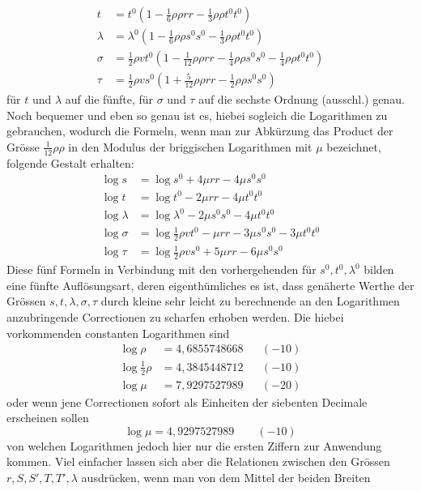 %
\[
\begin{aligned}
t&=t^0(1-\tfrac{1}{6}\rho\rho rr-\tfrac{1}{3}\rho\rho t^0t^0)\\
\lambda&=\lambda^0(1-\tfrac{1}{6}\rho\rho s^0s^0-\tfrac{1}{3}\rho\rho t^0t^0)\\
\sigma&=\tfrac{1}{2}\rho vt^0(1-\tfrac{1}{12}\rho\rho rr-\tfrac{1}{4}\rho\rho s^0s^0-\tfrac{1}{4}\rho\rho t^0t^0)\\
\tau&=\tfrac{1}{2}\rho vs^0(1+\tfrac{5}{12}\rho\rho rr-\tfrac{1}{2}\rho\rho s^0s^0)
\end{aligned}
\]
für \(t\) und \(\lambda\) auf die fünfte, für \(\sigma\) und \(\tau\) auf die sechste Ordnung (ausschl.) genau. Noch bequemer und eben so genau ist es, hiebei sogleich die Logarithmen zu gebrauchen, wodurch die Formeln, wenn man zur Abkürzung das Product der Grösse \(\tfrac{1}{12}\rho\rho\) in den Modulus der briggischen Logarithmen mit \(\mu\) bezeichnet, folgende Gestalt erhalten:
\[
\begin{aligned}
\log s&=\log s^0+4\mu rr-4\mu s^0s^0\\
\log t&=\log t^0-2\mu rr-4\mu t^0t^0\\
\log\lambda&=\log\lambda^0-2\mu s^0s^0-4\mu t^0t^0\\
\log\sigma&=\log\tfrac{1}{2}\rho vt^0-\mu rr-3\mu s^0s^0-3\mu t^0t^0\\
\log\tau&=\log\tfrac{1}{2}\rho vs^0+5\mu rr-6\mu s^0s^0
\end{aligned}
\]
\indent Diese fünf Formeln in Verbindung mit den vorhergehenden für \(s^0,t^0,\lambda^0\) bilden eine fünfte Auflösungsart, deren eigenthümliches es ist, dass genäherte Werthe der Grössen \(s,t,\lambda,\sigma,\tau\) durch kleine sehr leicht zu berechnende an den Logarithmen anzubringende Correctionen zu scharfen erhoben werden. Die hiebei vorkommenden constanten Logarithmen sind
\[
\begin{aligned}
\log\rho&=4{,}6855748668&&(-10)\\
\log\tfrac{1}{2}\rho&=4{,}3845448712&&(-10)\\
\log\mu&=7{,}9297527989&&(-20)
\end{aligned}
\]
oder wenn jene Correctionen sofort als Einheiten der siebenten Decimale erscheinen sollen
\[
\log\mu=4{,}9297527989\qquad(-10)
\]
von welchen Logarithmen jedoch hier nur die ersten Ziffern zur Anwendung kommen.
Viel einfacher lassen sich aber die Relationen zwischen den Grössen \(r,S,S',T,T',\lambda\) ausdrücken, wenn man von dem Mittel der beiden Breiten
